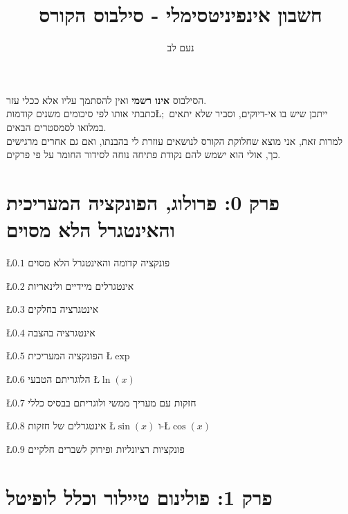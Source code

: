 \documentclass[english,hebrew]{article}
\begin{document}
\title{חשבון אינפיניטסימלי {\endL} - סילבוס הקורס}
\author{נעם לב}

\maketitle
\noindent{}
\begin{center}
הסילבוס \textbf{אינו רשמי }ואין להסתמך עליו אלא ככלי עזר.\\
כתבתי אותו לפי סיכומים משנים קודמות\L{$;$} ייתכן שיש בו אי-דיוקים,
וסביר שלא יתאים במלואו לסמסטרים הבאים.\\
למרות זאת, אני מוצא שחלוקת הקורס לנושאים עוזרת לי בהבנתו, ואם גם אחרים
מרגישים כך, אולי הוא ישמש להם נקודת פתיחה נוחה לסידור החומר על פי
פרקים.
\par\end{center}

\medskip{}

\section{פרק 0: פרולוג, הפונקציה המעריכית והאינטגרל הלא מסוים}

\L{$0.1$} פונקציה קדומה והאינטגרל הלא מסוים

\L{$0.2$} אינטגרלים מיידיים ולינאריות

\L{$0.3$} אינטגרציה בחלקים

\L{$0.4$} אינטגרציה בהצבה

\L{$0.5$} הפונקציה המעריכית \L{$\exp$}

\L{$0.6$} הלוגריתם הטבעי \L{$\ln(x)$}

\L{$0.7$} חזקות עם מעריך ממשי ולוגריתם בבסיס כללי

\L{$0.8$} אינטגרלים של חזקות \L{$\sin(x)$} ו-\L{$\cos(x)$}

\L{$0.9$} פונקציות רציונליות ופירוק לשברים חלקיים

\section{פרק 1: פולינום טיילור וכלל לופיטל}
\end{document}
